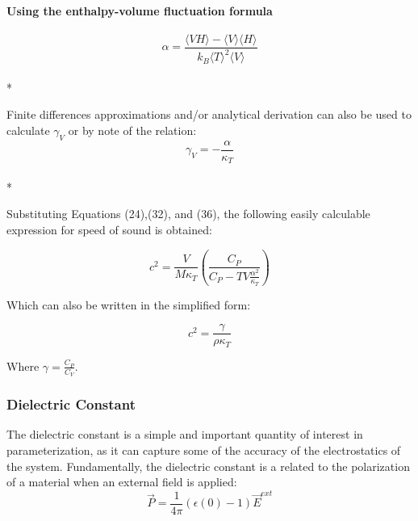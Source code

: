 \documentclass[9pt,bestpractices]{livecoms}
\begin{document}
\paragraph{Using the enthalpy-volume fluctuation formula}
\begin{equation}\alpha = \frac{\langle VH \rangle - \langle V \rangle \langle H \rangle}{k_B \langle T \rangle^2 \langle V \rangle}\end{equation}\\*

Finite differences approximations and/or analytical derivation can also be used to calculate $\gamma_V$ or by note of the relation:
\begin{equation}\gamma_V = - \frac{\alpha}{\kappa_T}\end{equation}\\*

Substituting Equations (24),(32), and (36), the following easily calculable expression for speed of sound is obtained:

\begin{equation} c^2=\frac{V}{M \kappa_T}\left(\frac{C_P}{C_P -TV\frac{\alpha^2}{\kappa_T}}\right)\end{equation}

Which can also be written in the simplified form:

\begin{equation} c^2= \frac{\gamma}{\rho \kappa_T} \end{equation}

Where $ \gamma=\frac{C_P}{C_V} $.


\subsubsection{Dielectric Constant}

The dielectric constant is a simple and important quantity of interest in parameterization, as it can capture some of the accuracy of the electrostatics of the system.  Fundamentally, the dielectric constant is a related to the polarization of a material when an external field is applied: \cite{dielec_riniker}
\begin{equation} \vec{P} = \frac{1}{4\pi}(\epsilon(0)-1)\vec{E}^{ext} \end{equation}
\end{document}
